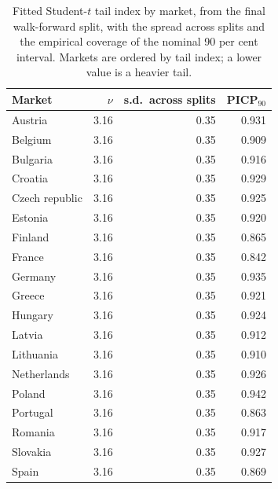 \begin{table}[htbp]
\centering
\small
\caption{Fitted Student-$t$ tail index by market, from the final walk-forward split, with the spread across splits and the empirical coverage of the nominal 90 per cent interval. Markets are ordered by tail index; a lower value is a heavier tail.}
\label{tab:nu-by-channel}
\begin{tabular}{@{}lrrr@{}}
\toprule
Market & $\nu$ & s.d.\ across splits & PICP$_{90}$ \\
\midrule
Austria & 3.16 & 0.35 & 0.931 \\
Belgium & 3.16 & 0.35 & 0.909 \\
Bulgaria & 3.16 & 0.35 & 0.916 \\
Croatia & 3.16 & 0.35 & 0.929 \\
Czech republic & 3.16 & 0.35 & 0.925 \\
Estonia & 3.16 & 0.35 & 0.920 \\
Finland & 3.16 & 0.35 & 0.865 \\
France & 3.16 & 0.35 & 0.842 \\
Germany & 3.16 & 0.35 & 0.935 \\
Greece & 3.16 & 0.35 & 0.921 \\
Hungary & 3.16 & 0.35 & 0.924 \\
Latvia & 3.16 & 0.35 & 0.912 \\
Lithuania & 3.16 & 0.35 & 0.910 \\
Netherlands & 3.16 & 0.35 & 0.926 \\
Poland & 3.16 & 0.35 & 0.942 \\
Portugal & 3.16 & 0.35 & 0.863 \\
Romania & 3.16 & 0.35 & 0.917 \\
Slovakia & 3.16 & 0.35 & 0.927 \\
Spain & 3.16 & 0.35 & 0.869 \\
\bottomrule
\end{tabular}
\end{table}
